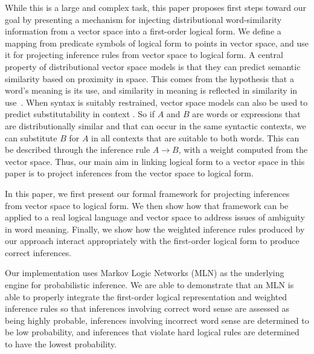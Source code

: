 While this is a large and complex task, this paper proposes first steps toward
our goal by presenting a mechanism for injecting distributional word-similarity
information from a vector space into a first-order logical form.  We
define a mapping from predicate symbols of logical form to points in
vector space, and use it for projecting inference rules from vector
space to logical form. %
A central property of distributional vector space models is that they
can predict semantic similarity based on proximity in space.  This comes from
the hypothesis that a word's meaning is its use, and similarity in
meaning is reflected in similarity in
use~\citep{wittgenstein:pij1953,firth:slaj1957,harris:wj1954}. 
When syntax is suitably restrained, vector space models can also be used to 
predict substitutability in context
\citep{lin:nlej2001,mitchell:acl2008,erk:emnlp2008,thater:acl2010,reisinger:naacl2010,dinu:emnlp2010,vandecruys:emnlp2011}.
So if $A$ and $B$ are words or
expressions that are distributionally similar and that can occur in
the same syntactic contexts, we can substitute $B$ for $A$ in all
contexts that are suitable to both words. This can be described
through the inference rule $A \to B$, with a weight computed from the
vector space. Thus, our main aim in linking logical form to a vector
space in this paper is to project inferences from the vector space to
logical form.

In this paper, we first present our formal framework for projecting inferences
from vector space to logical form.  We then show how that framework can be
applied to a real logical language and vector space to address issues of
ambiguity in word meaning.  Finally, we show how the weighted inference rules
produced by our approach interact appropriately with the first-order logical
form to produce correct inferences.

Our implementation uses Markov Logic Networks (MLN)\citep{richardson:mlj06} as
the underlying engine for probabilistic inference.  We are able to demonstrate
that an MLN is able to properly integrate the first-order logical representation
and weighted inference rules so that inferences involving correct word sense are
assessed as being highly probable, inferences involving incorrect word sense are
determined to be low probability, and inferences that violate hard logical rules
are determined to have the lowest probability.
